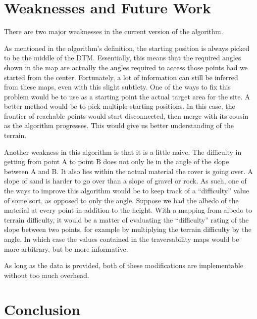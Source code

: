\documentclass[12pt]{article}
\begin{document}
\section{Weaknesses and Future Work}
\label{sec:weaknesses_and_future_work}
\par There are two major weaknesses in the current version of the algorithm.
\par As mentioned in the algorithm's definition, the starting position is always picked to be the middle of the DTM. Essentially, this means that the required angles shown in the map are actually the angles required to access those points had we started from the center. Fortunately, a lot of information can still be inferred from these maps, even with this slight subtlety. One of the ways to fix this problem would be to use as a starting point the actual target area for the site. A better method would be to pick multiple starting positions. In this case, the frontier of reachable points would start disconnected, then merge with its cousin as the algorithm progresses. This would give us better understanding of the terrain.
\par Another weakness in this algorithm is that it is a little naive. The difficulty in getting from point A to point B does not only lie in the angle of the slope between A and B. It also lies within the actual material the rover is going over. A slope of sand is harder to go over than a slope of gravel or rock. As such, one of the ways to improve this algorithm would be to keep track of a ``difficulty'' value of some sort, as opposed to only the angle. Suppose we had the albedo of the material at every point in addition to the height. With a mapping from albedo to terrain difficulty, it would be a matter of evaluating the ``difficulty'' rating of the slope between two points, for example by multiplying the terrain difficulty by the angle. In which case the values contained in the traversability maps would be more arbitrary, but be more informative.
\par As long as the data is provided, both of these modifications are implementable without too much overhead.

\section{Conclusion}
\label{sec:conclusion}
\end{document}
